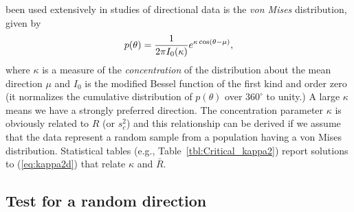 been used extensively in studies of directional data is the \emph{von Mises} distribution, given by
\begin{equation}
	\index{Probability distribution!von Mises}
	\index{von Mises distribution}
p(\theta) = \frac{1}{2 \pi I_0 ( \kappa)} e^{\kappa \cos\left( \theta - \mu \right)},
\label{eg:von_Mises}
\end{equation}
where $\kappa$ is a measure of the \emph{concentration} of the distribution about the mean direction $\mu$ and $I_0$ is 
the modified Bessel function of the first kind and order zero (it normalizes the 
cumulative distribution of $p(\theta)$ over $360^{\circ}$ to unity.)  A large $\kappa$ means we have a strongly preferred direction.
The concentration parameter $\kappa$ is obviously related to
$R$ (or $s_c^2$) and this relationship can be 
derived if we assume that the data represent a random sample from a population having a von Mises 
distribution.  Statistical tables (e.g., Table~\ref{tbl:Critical_kappa2}) report solutions to (\ref{eq:kappa2d}) that relate $\kappa$ and $\bar{R}$.

\subsection{Test for a random direction}

